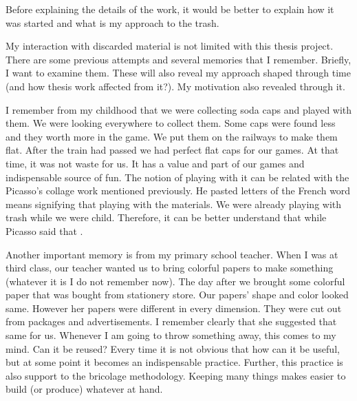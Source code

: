 






Before explaining the details of the work, it would be better to explain how it was started and what is my approach to the trash. %

My interaction with discarded material is not limited with this thesis project. There are some previous attempts and several memories that I remember. Briefly, I want to examine them. These will also reveal my approach shaped through time (and how thesis work affected from it?). My motivation also revealed through it.

I remember from my childhood that we were collecting soda caps and played with them. We were looking everywhere to collect them. Some caps were found less and they worth more in the game. We put them on the railways to make them flat. After the train had passed we had perfect flat caps for our games. At that time, it was not waste for us. It has a value and part of our games and indispensable source of fun. The notion of playing with it can be related with the Picasso's collage work  mentioned previously. He pasted letters of the French word  means  signifying that playing with the materials. We were already playing with trash while we were child. Therefore, it can be better understand that while Picasso said that .

Another important memory is from my primary school teacher. When I was at third class, our teacher wanted us to bring colorful papers to make something (whatever it is I do not remember now). The day after we brought some colorful paper that was bought from stationery store. Our papers' shape and color looked same. However her papers were different in every dimension. They were cut out from packages and advertisements. I remember clearly that she suggested that same for us.  Whenever I am going to throw something away, this comes to my mind. Can it be reused? Every time it is not obvious that how can it be useful, but at some point it becomes an indispensable practice. Further, this practice is also support to the bricolage methodology. Keeping many things makes easier to build (or produce) whatever at hand. 


